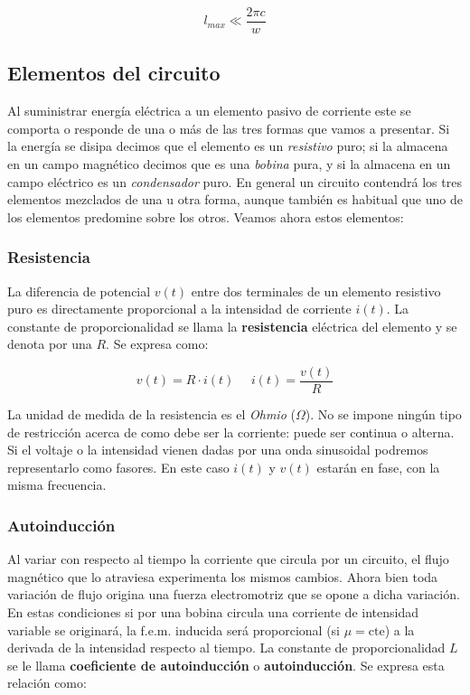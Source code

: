 \documentclass[12pt,a4paper]{article}
\begin{document}
\begin{equation}
l_{max} \ll \frac{2 \pi c}{w}
\end{equation}


\subsection{Elementos del circuito}

Al suministrar energía eléctrica a un elemento pasivo de corriente este se comporta o responde de una o más de las tres formas que vamos a presentar. Si la energía se disipa decimos que el elemento es un \textit{resistivo} puro; si la almacena en un campo magnético decimos que es una \textit{bobina}  pura, y si la almacena en un campo eléctrico es un \textit{condensador} puro. En general un circuito contendrá los tres elementos mezclados de una u otra forma, aunque también es habitual que uno de los elementos predomine sobre los otros. Veamos ahora estos elementos:

\subsubsection{Resistencia}

La diferencia de potencial $v(t)$ entre dos terminales de un elemento resistivo puro es directamente proporcional a la intensidad de corriente $i(t)$. La constante de proporcionalidad se llama la \textbf{resistencia} eléctrica del elemento y se denota por una $R$. Se expresa como:

\begin{equation}
v(t) = R \cdot i(t) \ \ \ \ \ \  i(t) = \dfrac{v(t)}{R}
\end{equation}

La unidad de medida de la resistencia es el \textit{Ohmio} ($\Omega$). No se impone ningún tipo de restricción acerca de como debe ser la corriente: puede ser continua o alterna.\\

Si el voltaje o la intensidad vienen dadas por una onda sinusoidal podremos representarlo como fasores. En este caso $i(t)$ y $v(t)$ estarán en fase, con la misma frecuencia.
 
 
 
\subsubsection{Autoinducción}

Al variar con respecto al tiempo la corriente que circula por un circuito, el flujo magnético que lo atraviesa experimenta los mismos cambios. Ahora bien toda variación de flujo origina una fuerza electromotriz que se opone a dicha variación. En estas condiciones si por una bobina circula una corriente de intensidad variable se originará, la f.e.m. inducida será proporcional (si $\mu = \mathrm{cte}$) a la derivada de la intensidad respecto al tiempo. La constante de proporcionalidad $L$ se le llama \textbf{coeficiente de autoinducción} o \textbf{autoinducción}. Se expresa esta relación como:
\end{document}
